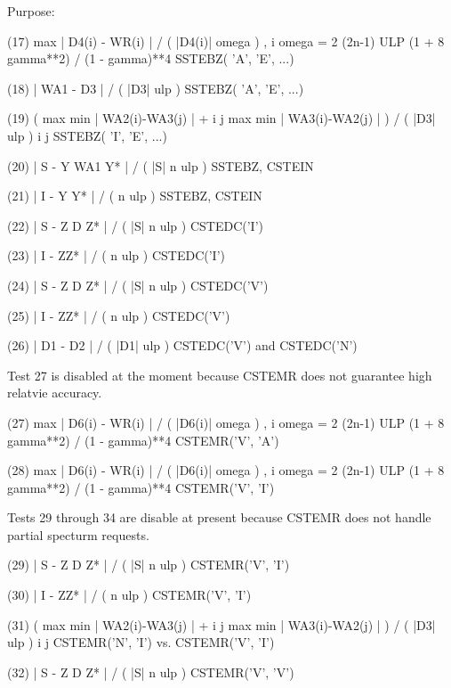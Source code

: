 \begin{DoxyParagraph}{Purpose\+: }
\begin{DoxyVerb}
 (17)    max | D4(i) - WR(i) | / ( |D4(i)| omega ) ,
          i
         omega = 2 (2n-1) ULP (1 + 8 gamma**2) / (1 - gamma)**4
                                              SSTEBZ( 'A', 'E', ...)

 (18)    | WA1 - D3 | / ( |D3| ulp )          SSTEBZ( 'A', 'E', ...)

 (19)    ( max { min | WA2(i)-WA3(j) | } +
            i     j
           max { min | WA3(i)-WA2(j) | } ) / ( |D3| ulp )
            i     j
                                              SSTEBZ( 'I', 'E', ...)

 (20)    | S - Y WA1 Y* | / ( |S| n ulp )  SSTEBZ, CSTEIN

 (21)    | I - Y Y* | / ( n ulp )          SSTEBZ, CSTEIN

 (22)    | S - Z D Z* | / ( |S| n ulp )    CSTEDC('I')

 (23)    | I - ZZ* | / ( n ulp )           CSTEDC('I')

 (24)    | S - Z D Z* | / ( |S| n ulp )    CSTEDC('V')

 (25)    | I - ZZ* | / ( n ulp )           CSTEDC('V')

 (26)    | D1 - D2 | / ( |D1| ulp )           CSTEDC('V') and
                                              CSTEDC('N')

 Test 27 is disabled at the moment because CSTEMR does not
 guarantee high relatvie accuracy.

 (27)    max | D6(i) - WR(i) | / ( |D6(i)| omega ) ,
          i
         omega = 2 (2n-1) ULP (1 + 8 gamma**2) / (1 - gamma)**4
                                              CSTEMR('V', 'A')

 (28)    max | D6(i) - WR(i) | / ( |D6(i)| omega ) ,
          i
         omega = 2 (2n-1) ULP (1 + 8 gamma**2) / (1 - gamma)**4
                                              CSTEMR('V', 'I')

 Tests 29 through 34 are disable at present because CSTEMR
 does not handle partial specturm requests.

 (29)    | S - Z D Z* | / ( |S| n ulp )    CSTEMR('V', 'I')

 (30)    | I - ZZ* | / ( n ulp )           CSTEMR('V', 'I')

 (31)    ( max { min | WA2(i)-WA3(j) | } +
            i     j
           max { min | WA3(i)-WA2(j) | } ) / ( |D3| ulp )
            i     j
         CSTEMR('N', 'I') vs. CSTEMR('V', 'I')

 (32)    | S - Z D Z* | / ( |S| n ulp )    CSTEMR('V', 'V')


\end{DoxyVerb}
\end{DoxyParagraph}
